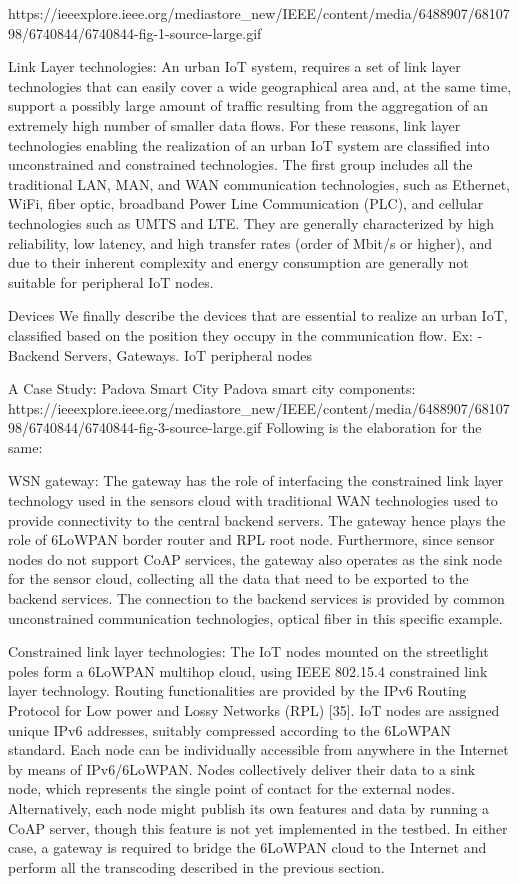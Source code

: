 https://ieeexplore.ieee.org/mediastore_new/IEEE/content/media/6488907/6810798/6740844/6740844-fig-1-source-large.gif

Link Layer technologies:
An urban IoT system, requires a set of link layer technologies that can easily cover a wide geographical area and, at the same time, support a possibly large amount of traffic resulting from the aggregation of an extremely high number of smaller data flows. For these reasons, link layer technologies enabling the realization of an urban IoT system are classified into unconstrained and constrained technologies. The first group includes all the traditional LAN, MAN, and WAN communication technologies, such as Ethernet, WiFi, fiber optic, broadband Power Line Communication (PLC), and cellular technologies such as UMTS and LTE. They are generally characterized by high reliability, low latency, and high transfer rates (order of Mbit/s or higher), and due to their inherent complexity and energy consumption are generally not suitable for peripheral IoT nodes.


Devices
We finally describe the devices that are essential to realize an urban IoT, classified based on the position they occupy in the communication flow. Ex: 
- Backend Servers, Gateways. IoT peripheral nodes

A Case Study: Padova Smart City
Padova smart city components: https://ieeexplore.ieee.org/mediastore_new/IEEE/content/media/6488907/6810798/6740844/6740844-fig-3-source-large.gif
Following is the elaboration for the same: 


WSN gateway: The gateway has the role of interfacing the constrained link layer technology used in the sensors cloud with traditional WAN technologies used to provide connectivity to the central backend servers. The gateway hence plays the role of 6LoWPAN border router and RPL root node. Furthermore, since sensor nodes do not support CoAP services, the gateway also operates as the sink node for the sensor cloud, collecting all the data that need to be exported to the backend services. The connection to the backend services is provided by common unconstrained communication technologies, optical fiber in this specific example.

Constrained link layer technologies: The IoT nodes mounted on the streetlight poles form a 6LoWPAN multihop cloud, using IEEE 802.15.4 constrained link layer technology. Routing functionalities are provided by the IPv6 Routing Protocol for Low power and Lossy Networks (RPL) [35]. IoT nodes are assigned unique IPv6 addresses, suitably compressed according to the 6LoWPAN standard. Each node can be individually accessible from anywhere in the Internet by means of IPv6/6LoWPAN. Nodes collectively deliver their data to a sink node, which represents the single point of contact for the external nodes. Alternatively, each node might publish its own features and data by running a CoAP server, though this feature is not yet implemented in the testbed. In either case, a gateway is required to bridge the 6LoWPAN cloud to the Internet and perform all the transcoding described in the previous section.

